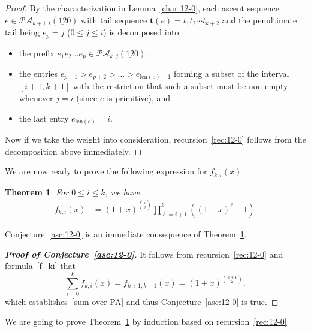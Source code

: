 \documentclass[12pt,A4]{amsart}
\numberwithin{equation}{section}
\theoremstyle{plain}
\newtheorem{theorem}{Theorem}[section]
\theoremstyle{definition}
\def\PA{\mathcal{PA}}
\def\len{\mathrm{len}}
\def\tt{\mathbf{t}}
\begin{document}
\begin{proof}
By the characterization in Lemma~\ref{char:12-0}, each ascent sequence $e\in\PA_{k+1,i}(\underline{12}0)$ with tail sequence $\tt(e)=t_1t_2\cdots t_{k+2}$ and the penultimate tail being $e_p=j$ ($0\le j\le i$) is  decomposed into
\begin{itemize}
\item the prefix $e_1e_2\ldots e_p\in\PA_{k,j}(\underline{12}0)$,
\item the entries $e_{p+1}>e_{p+2}>\ldots>e_{\len(e)-1}$ forming a subset of the interval $[i+1,k+1]$ with the restriction that such a subset must be non-empty whenever $j=i$ (since $e$ is primitive), and
\item the last entry $e_{\len(e)}=i$.
\end{itemize}
 Now if we take the weight into consideration, recursion~\eqref{rec:12-0} follows from the decomposition above immediately.
\end{proof}

We are now ready to prove the following expression for $f_{k,i}(x)$. 


\begin{theorem}\label{gen:conj1}
For $0\le i\le k$,  we have
\begin{align}\label{f_ki}
f_{k,i}(x)&=(1+x)^{\binom{i}{2}}\prod_{\ell=i+1}^{k}\left((1+x)^{\ell}-1\right).
\end{align}
\end{theorem}

Conjecture~\ref{asc:12-0} is an immediate consequence of Theorem~\ref{gen:conj1}.
\begin{proof}[{\bf Proof of Conjecture~\ref{asc:12-0}}]
It follows from recursion~\eqref{rec:12-0} and formula~\eqref{f_ki} that
$$
\sum_{i=0}^k f_{k,i}(x)=f_{k+1,k+1}(x)=(1+x)^{\binom{k+1}{2}},
$$
which establishes~\eqref{sum over PA} and thus Conjecture~\ref{asc:12-0} is true.
\end{proof}

We are going to prove Theorem~\ref{gen:conj1} by induction based on recursion~\eqref{rec:12-0}.
\end{document}
